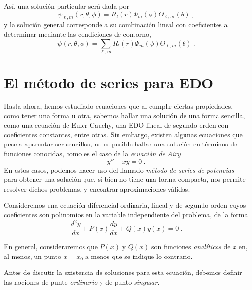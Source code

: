 Así, una solución particular será dada por
\begin{equation}
    \psi_{\ell, m}(r, \theta, \phi) = R_\ell(r) \Phi_m(\phi) \Theta_{\ell, m}(\theta) \ ,
\end{equation}
y la solución general corresponde a su combinación lineal con coeficientes a determinar mediante las condiciones de contorno,
\begin{equation}
    \psi(r, \theta, \phi) = \sum_{\ell, m} R_\ell(r) \Phi_m(\phi) \Theta_{\ell, m}(\theta) \ .
\end{equation}

\section{El método de series para EDO}

Hasta ahora, hemos estudiado ecuaciones que al cumplir ciertas propiedades, como tener una forma u otra, sabemos hallar una solución de una forma sencilla, como una ecuación de Euler-Cauchy, una EDO lineal de segundo orden con coeficientes constantes, entre otras. Sin embargo, existen algunas ecuaciones que pese a aparentar ser sencillas, no es posible hallar una solución en términos de funciones conocidas, como es el caso de la \emph{ecuación de Airy}
\begin{equation}
    y'' - xy = 0 \ .
\end{equation}
En estos casos, podemos hacer uso del llamado \emph{método de series de potencias} para obtener una solución que, si bien no tiene una forma compacta, nos permite resolver dichos problemas, y encontrar aproximaciones válidas.



Consideremos una ecuación diferencial ordinaria, lineal y de segundo orden cuyos coeficientes son polinomios en la variable independiente del problema, de la forma
\begin{equation} \label{eq:EDO_Series}
    \frac{d^2 y}{dx} + P(x) \frac{dy}{dx} + Q(x) y(x) = 0 \ .
\end{equation}

En general, consideraremos que $P(x)$ y $Q(x)$ son funciones \emph{analíticas} de $x$ en, al menos, un punto $x=x_0$ a menos que se indique lo contrario.

Antes de discutir la existencia de soluciones para esta ecuación, debemos definir las nociones de punto \emph{ordinario} y de punto \emph{singular}.

